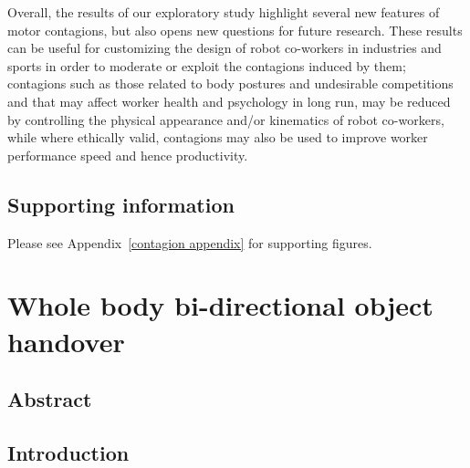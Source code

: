 \documentclass[a4paper, 12pt, oneside]{Thesis}  %
\begin{document}
Overall, the results of our exploratory study highlight several new features of motor contagions, but also opens new questions for future research. These results can be useful for customizing the design of robot co-workers in industries and sports in order to moderate or exploit the contagions induced by them; contagions such as those related to body postures and undesirable competitions and that may affect worker health and psychology in long run, may be reduced by controlling the physical appearance and/or kinematics of robot co-workers, while where ethically valid, contagions may also be used to improve worker performance speed and hence productivity.



\section*{Supporting information}

Please see Appendix~\ref{contagion appendix} for supporting figures.


\clearpage
	
{\color{blue}\chapter{Whole body bi-directional object handover}\label{handover chapter}}

\section*{Abstract}


\clearpage
\section{Introduction}
\end{document}
